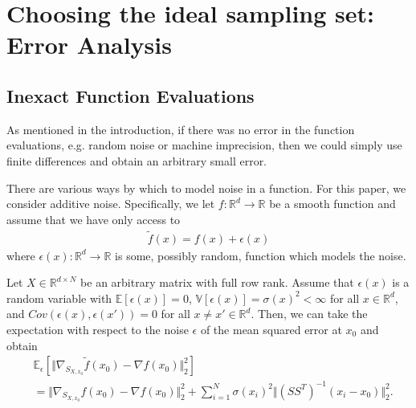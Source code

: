 


\section{Choosing the ideal sampling set: Error Analysis}


\subsection{Inexact Function Evaluations}
As mentioned in the introduction, if there was no error in the function evaluations, e.g. random noise or machine imprecision, then we could simply use finite differences and obtain an arbitrary small error. 

There are various ways by which to model noise in a function. For this paper, we consider additive noise. Specifically, we let $f : \mathbb{R}^d \rightarrow \mathbb{R}$ be a smooth function and assume that we have only access to
\begin{align}
    \tilde{f}(x) = f(x) + \epsilon(x)
\end{align}
where $\epsilon(x) : \mathbb{R}^d \rightarrow \mathbb{R}$ is some, possibly random, function which models the noise. 


\begin{lemma}\label{lma:mse_noise}
Let $X \in \mathbb{R}^{d \times N}$ be an arbitrary matrix with full row rank. Assume that $\epsilon(x)$ is a random variable with $\mathbb{E}[\epsilon(x)] = 0$,  $\mathbb{V}[\epsilon(x)] = \sigma(x)^2 < \infty$ for all $x \in \mathbb{R}^d$, and $Cov(\epsilon(x), \epsilon(x')) = 0$ for all $x \neq x' \in \mathbb{R}^d$. 
Then, we can take the expectation with respect to the noise $\epsilon$ of the mean squared error at $x_0$ and obtain
\begin{align}
    &\mathbb{E}_{\epsilon}[\Vert \nabla_{S_{X, x_0}} \tilde{f}(x_0) - \nabla f(x_0) \Vert_2^2] \\
    &= \Vert \nabla_{S_{X, x_0}} f(x_0) - \nabla f(x_0) \Vert_2^2 
    + \sum_{i = 1}^N \sigma(x_i)^2 \Vert (SS^T)^{-1} (x_i - x_0) \Vert_2^2.
\end{align}
\end{lemma}

